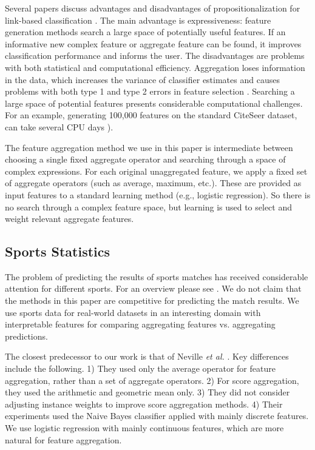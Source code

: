 \documentclass[conference]{IEEEtran}
\begin{document}
Several papers discuss advantages and disadvantages of  propositionalization for link-based classification \cite{DavidJensen2002,han2009}.
The main advantage is expressiveness: feature generation methods search a large space of potentially useful features. If an informative new complex feature or aggregate feature can be found, it improves classification performance and informs the user. The disadvantages are problems with both statistical and computational efficiency. Aggregation loses information in the data, which increases the variance of classifier estimates and causes problems with both type 1 and type 2 errors in feature selection \cite{DavidJensen2002}. Searching a large space of potential features presents considerable computational challenges. For an example, generating 100,000 features on the standard CiteSeer dataset, can take several CPU days
\cite[Ch.16.1.2]{Popescul2007}).

The feature aggregation method we use in this paper is intermediate between choosing a single fixed aggregate operator and searching through a space of complex expressions. For each original unaggregated feature, we apply a fixed set of aggregate operators (such as average, maximum, etc.). These are provided as input features to a standard learning method (e.g., logistic regression). So there is no search through a complex feature space, but learning is used to select and weight relevant aggregate features.



\subsection{Sports Statistics} The problem of predicting the results of sports matches has received considerable attention for different sports. For an overview please see \cite{Schumaker2010}. We do not claim that the methods in this paper are competitive for predicting the match results.
We use sports data for real-world datasets in an interesting domain with interpretable features for comparing aggregating features vs. aggregating predictions.

The closest predecessor to our work is that of Neville {\em et al.} \cite{Neville2003}. Key differences include the following. 1) They used only the average operator for feature aggregation, rather than a set of aggregate operators. 2)  For score aggregation, they used the arithmetic and geometric mean only. 3) They did not consider adjusting instance weights to improve score aggregation methods. 4) Their experiments used the Naive Bayes classifier applied with mainly discrete features. We use logistic regression with mainly continuous features, which are more natural for feature aggregation.
\end{document}
